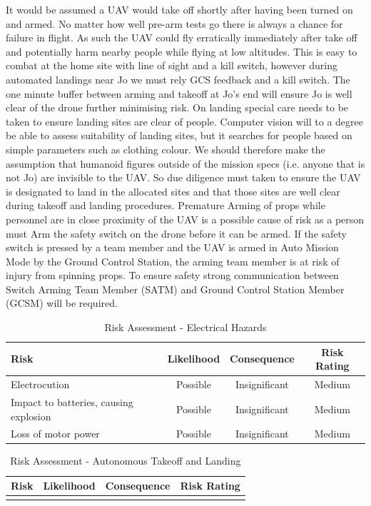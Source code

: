 It would be assumed a UAV would take off shortly after having been turned on and armed. No matter how well pre-arm tests go there is always a chance for failure in flight. As such the UAV could fly erratically immediately after take off and potentially harm nearby people while flying at low altitudes.
This is easy to combat at the home site with line of sight and a kill switch, however during automated landings near Jo we must rely GCS feedback and a kill switch. The one minute buffer between arming and takeoff at Jo’s end will ensure Jo is well clear of the drone further minimising risk.
On landing special care needs to be taken to ensure landing sites are clear of people. Computer vision will to a degree be able to assess suitability of landing sites, but it searches for people based on simple parameters such as clothing colour. We should therefore make the assumption that humanoid figures outside of the mission specs (i.e. anyone that is not Jo) are invisible to the UAV. So due diligence must taken to ensure the UAV is designated to land in the allocated sites and that those sites are well clear during takeoff and landing procedures.
Premature Arming of props while personnel are in close proximity of the UAV is a possible cause of risk as a person must Arm the safety switch on the drone before it can be armed. If the safety switch is pressed by a team member and the UAV is armed in Auto Mission Mode by the Ground Control Station, the arming team member is at risk of injury from spinning props. To ensure safety strong communication between Switch Arming Team Member (SATM) and Ground Control Station Member (GCSM) will be required.

\begin{table}[!h]
	\label{tab:risks-electrical}
	\centering
	\begin{tabularx}{\textwidth}{|Y|c|c|c|}
		\hline
		\textbf{Risk} & \textbf{Likelihood} & \textbf{Consequence} & \textbf{Risk Rating}\\
		\hline
		Electrocution & Possible & Insignificant & Medium\\
		\hline
		Impact to batteries, causing explosion & Possible & Insignificant & Medium\\
		\hline
		Loss of motor power & Possible & Insignificant & Medium\\		
		\hline
	\end{tabularx} 
	\caption{Risk Assessment - Electrical Hazards}
\end{table}

\begin{table}[!h]
	\label{tab:risks-autonomy}
	\centering
	\begin{tabularx}{\textwidth}{|Y|c|c|c|}
		\hline
		\textbf{Risk} & \textbf{Likelihood} & \textbf{Consequence} & \textbf{Risk Rating}\\
		\hline
		& & & \\
		\hline
	\end{tabularx} 
	\caption{Risk Assessment - Autonomous Takeoff and Landing}
\end{table}

